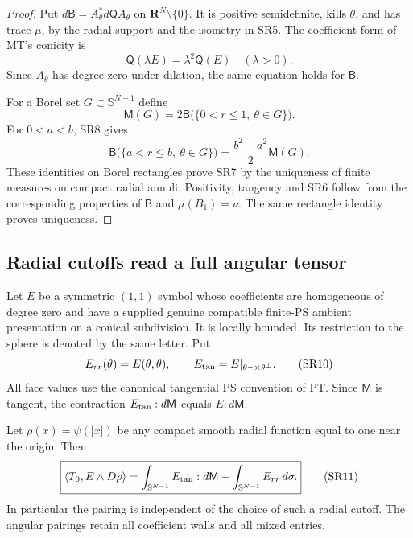\begin{proof}
Put $d\mathsf B=A_\theta^*d\mathsf Q A_\theta$ on
$\mathbf R^N\setminus\{0\}$.  It is positive semidefinite,
kills $\theta$, and has trace $\mu$, by the radial support
and the isometry in SR5.  The coefficient form of MT's
conicity is
\[
             \mathsf Q(\lambda E)=\lambda^2\mathsf Q(E)
                              \quad(\lambda>0).
 \tag{SR8}
\]
Since $A_\theta$ has degree zero under dilation, the same
equation holds for $\mathsf B$.

For a Borel set $G\subset\mathbb S^{N-1}$ define
\[
 \mathsf M(G)=2\mathsf B
       \bigl(\{0<r\le1,\ \theta\in G\}\bigr).
 \tag{SR9}
\]
For $0<a<b$, SR8 gives
\[
 \mathsf B\bigl(\{a<r\le b,\ \theta\in G\}\bigr)
              =\frac{b^2-a^2}{2}\mathsf M(G).
\]
These identities on Borel rectangles prove SR7 by the
uniqueness of finite measures on compact radial annuli.
Positivity, tangency and SR6 follow from the corresponding
properties of $\mathsf B$ and $\mu(B_1)=\nu$.
The same rectangle identity proves uniqueness.
\end{proof}

\subsection{Radial cutoffs read a full angular tensor}

Let $E$ be a symmetric $(1,1)$ symbol whose coefficients
are homogeneous of degree zero and have a supplied genuine
compatible finite-PS ambient presentation on a conical
subdivision.  It is locally bounded.  Its restriction to the
sphere is denoted by the same letter.  Put
\[
 E_{rr}(\theta)=E(\theta,\theta),\qquad
            E_{\rm tan}=E|_{\theta^\perp\times\theta^\perp}.
 \tag{SR10}
\]
All face values use the canonical tangential PS convention
of PT.  Since $\mathsf M$ is tangent, the contraction
$E_{\rm tan}:d\mathsf M$ equals $E:d\mathsf M$.

\begin{theorem}
\label{thm:r13-angular-critical-pairing}
Let $\rho(x)=\psi(|x|)$ be any compact smooth radial
function equal to one near the origin.  Then
\[
 \boxed{
 \langle T_0,E\wedge D\rho\rangle
       =\int_{\mathbb S^{N-1}}E_{\rm tan}:d\mathsf M
          -\int_{\mathbb S^{N-1}}E_{rr}\,d\sigma.}
 \tag{SR11}
\]
In particular the pairing is independent of the choice of
such a radial cutoff.  The angular pairings retain all
coefficient walls and all mixed entries.
\end{theorem}

